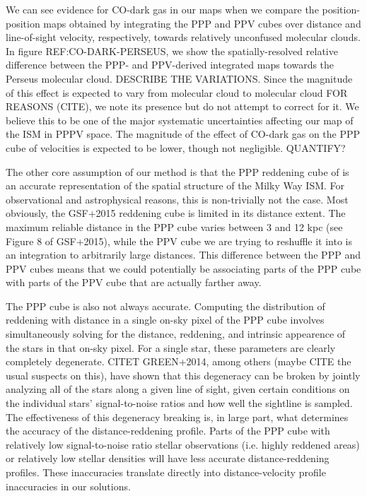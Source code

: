  We can see evidence for CO-dark gas in our maps when we compare the position-position maps obtained by integrating the PPP and PPV cubes over distance and line-of-sight velocity, respectively, towards relatively unconfused molecular clouds. In figure REF:CO-DARK-PERSEUS, we show the spatially-resolved relative difference between the PPP- and PPV-derived integrated maps towards the Perseus molecular cloud. DESCRIBE THE VARIATIONS. Since the magnitude of this effect is expected to vary from molecular cloud to molecular cloud FOR REASONS (CITE), we note its presence but do not attempt to correct for it. We believe this to be one of the major systematic uncertainties affecting our map of the ISM in PPPV space. The magnitude of the effect of CO-dark gas on the PPP cube of velocities is expected to be lower, though not negligible. QUANTIFY?

The other core assumption of our method is that the PPP reddening cube of \citet{Green_2015}  is an accurate representation of the spatial structure of the Milky Way ISM. For observational and astrophysical reasons, this is non-trivially not the case. Most obviously, the GSF+2015 reddening cube is limited in its distance extent. The maximum reliable distance in the PPP cube varies between 3 and 12 kpc (see Figure 8 of GSF+2015), while the PPV cube we are trying to reshuffle it into is an integration to arbitrarily large distances. This difference between the PPP and PPV cubes means that we could potentially be associating parts of the PPP cube with parts of the PPV cube that are actually farther away.

The PPP cube is also not always accurate. Computing the distribution of reddening with distance in a single on-sky pixel of the PPP cube involves simultaneously solving for the distance, reddening, and intrinsic appearence of the stars in that on-sky pixel. For a single star, these parameters are clearly completely degenerate. CITET GREEN+2014, among others (maybe CITE the usual suspects on this), have shown that this degeneracy can be broken by jointly analyzing all of the stars along a given line of sight, given certain conditions on the individual stars' signal-to-noise ratios and how well the sightline is sampled. The effectiveness of this degeneracy breaking is, in large part, what determines the accuracy of the distance-reddening profile. Parts of the PPP cube with relatively low signal-to-noise ratio stellar observations (i.e. highly reddened areas) or relatively low stellar densities will have less accurate distance-reddening profiles. These inaccuracies translate directly into distance-velocity profile inaccuracies in our solutions. 

